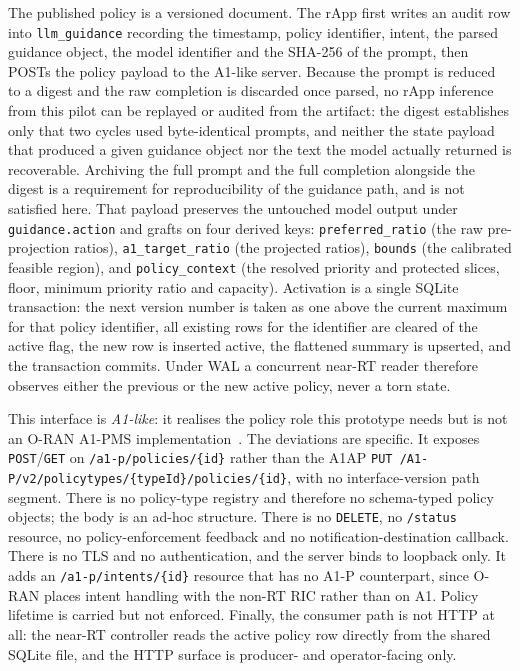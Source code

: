 The published policy is a versioned document. The rApp first writes an audit row into \texttt{llm\_guidance} recording the timestamp, policy identifier, intent, the parsed guidance object, the model identifier and the SHA-256 of the prompt, then POSTs the policy payload to the A1-like server. Because the prompt is reduced to a digest and the raw completion is discarded once parsed, no rApp inference from this pilot can be replayed or audited from the artifact: the digest establishes only that two cycles used byte-identical prompts, and neither the state payload that produced a given guidance object nor the text the model actually returned is recoverable. Archiving the full prompt and the full completion alongside the digest is a requirement for reproducibility of the guidance path, and is not satisfied here. That payload preserves the untouched model output under \texttt{guidance.action} and grafts on four derived keys: \texttt{preferred\_ratio} (the raw pre-projection ratios), \texttt{a1\_target\_ratio} (the projected ratios), \texttt{bounds} (the calibrated feasible region), and \texttt{policy\_context} (the resolved priority and protected slices, floor, minimum priority ratio and capacity). Activation is a single SQLite transaction: the next version number is taken as one above the current maximum for that policy identifier, all existing rows for the identifier are cleared of the active flag, the new row is inserted active, the flattened summary is upserted, and the transaction commits. Under WAL a concurrent near-RT reader therefore observes either the previous or the new active policy, never a torn state.

This interface is \emph{A1-like}: it realises the policy role this prototype needs but is not an O-RAN A1-PMS implementation~\cite{oran_a1}. The deviations are specific. It exposes \texttt{POST}/\texttt{GET} on \texttt{/a1-p/policies/\{id\}} rather than the A1AP \texttt{PUT /A1-P/v2/policytypes/\{typeId\}/policies/\{id\}}, with no interface-version path segment. There is no policy-type registry and therefore no schema-typed policy objects; the body is an ad-hoc structure. There is no \texttt{DELETE}, no \texttt{/status} resource, no policy-enforcement feedback and no notification-destination callback. There is no TLS and no authentication, and the server binds to loopback only. It adds an \texttt{/a1-p/intents/\{id\}} resource that has no A1-P counterpart, since O-RAN places intent handling with the non-RT RIC rather than on A1. Policy lifetime is carried but not enforced. Finally, the consumer path is not HTTP at all: the near-RT controller reads the active policy row directly from the shared SQLite file, and the HTTP surface is producer- and operator-facing only.
